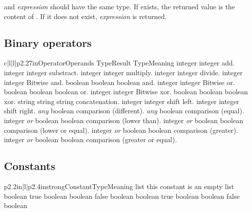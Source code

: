  and {\em expression} should have the same type. If  exists, the returned value is the content of . If it does not exist, {\em expression} is returned.


\subsection{Binary operators}

\begin{longtableiv}{c|l|l|p{2.27in}}{}{Operator}{Operands Type}{Result Type}{Meaning}
  \lineiv{+}
  {integer}
  {integer}
  {add.}
  \lineiv{-}
  {integer}
  {integer}
  {substract.}
  \lineiv{*}
  {integer}
  {integer}
  {multiply.}
  \lineiv{/}
  {integer}
  {integer}
  {divide.}
  \lineiv{\&}
  {integer}
  {integer}
  {Bitwise and.}
  \lineiv{\&}
  {boolean}
  {boolean}
  {boolean and.}
  \lineiv{$\mid$}
  {integer}
  {integer}
  {Bitwise or.}
  \lineiv{$\mid$}
  {boolean}
  {boolean}
  {boolean or.}
  \lineiv{$\wedge$}
  {integer}
  {integer}
  {Bitwise xor.}
  \lineiv{$\wedge$}
  {boolean}
  {boolean}
  {boolean xor.}
  {string}
  {string}
  {string concatenation.}
  \lineiv{$<<$}
  {integer}
  {integer}
  {shift left.}
  \lineiv{$>>$}
  {integer}
  {integer}
  {shift right.}
  \lineiv{!=}
  {{\em any}}
  {boolean}
  {comparison (different).}
  \lineiv{==}
  {{\em any}}
  {boolean}
  {comparison (equal).}
  \lineiv{$<$}
  {integer {\em or} boolean}
  {boolean}
  {comparison (lower than).}
  \lineiv{$<=$}
  {integer {\em or} boolean}
  {boolean}
  {comparison (lower or equal).}
  \lineiv{$>$}
  {integer {\em or} boolean}
  {boolean}
  {comparison (greater).}
  \lineiv{$>=$}
  {integer {\em or} boolean}
  {boolean}
  {comparison (greater or equal).}
\end{longtableiv}

\subsection{Constants}

\begin{longtableiii}{p{2.2in}|l|p{2.4in}}{strong}{Constant}{Type}{Meaning}
  {list}
  {this constant is an empty list}
  {boolean}
  {true boolean}
  {boolean}
  {false boolean}
  {boolean}
  {true boolean}
  {boolean}
  {false boolean}
\end{longtableiii}

